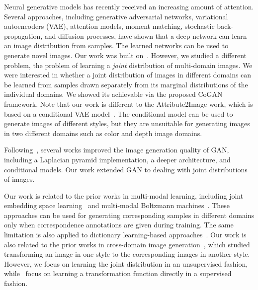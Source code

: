 \documentclass{article}
\begin{document}
Neural generative models has recently received an increasing amount of attention. Several approaches, including generative adversarial networks\cite{goodfellow2014generative}, variational autoencoders (VAE)\cite{kingma2013auto}, attention models\cite{gregor2015draw}, moment matching\cite{li2015generative}, stochastic back-propagation\cite{rezende2014stochastic}, and diffusion processes\cite{sohl2015deep}, have shown that a deep network can learn an image distribution from samples. The learned networks can be used to generate novel images. Our work was built on~\cite{goodfellow2014generative}. However, we studied a different problem, the problem of learning a {\it joint} distribution of multi-domain images. We were interested in whether a joint distribution of images in different domains can be learned from samples drawn separately from its marginal distributions of the individual domains. We showed its achievable via the proposed CoGAN framework. Note that our work is different to the Attribute2Image work\cite{yan2015attribute2image}, which is based on a conditional VAE model~\cite{kingma2014semi}. The conditional model can be used to generate images of different styles, but they are unsuitable for generating images in two different domains such as color and depth image domains.

Following~\cite{goodfellow2014generative}, several works improved the image generation quality of GAN, including a Laplacian pyramid implementation\cite{denton2015deep}, a deeper architecture\cite{radford2015unsupervised}, and conditional models\cite{mirza2014conditional}. Our work extended GAN to dealing with joint distributions of images.

Our work is related to the prior works in multi-modal learning, including joint embedding space learning~\cite{kiros2014unifying} and multi-modal Boltzmann machines~\cite{srivastava2012multimodal,ngiam2011multimodal}. These approaches can be used for generating corresponding samples in different domains only when correspondence annotations are given during training. The same limitation is also applied to dictionary learning-based approaches~\cite{wang2012semi,yang2010image}. Our work is also related to the prior works in cross-domain image generation~\cite{yim2015rotating,reed2015deep,dosovitskiy2015learning}, which studied transforming an image in one style to the corresponding images in another style. However, we focus on learning the joint distribution in an unsupervised fashion, while~\cite{yim2015rotating,reed2015deep,dosovitskiy2015learning} focus on learning a transformation function directly in a supervised fashion.
\end{document}
